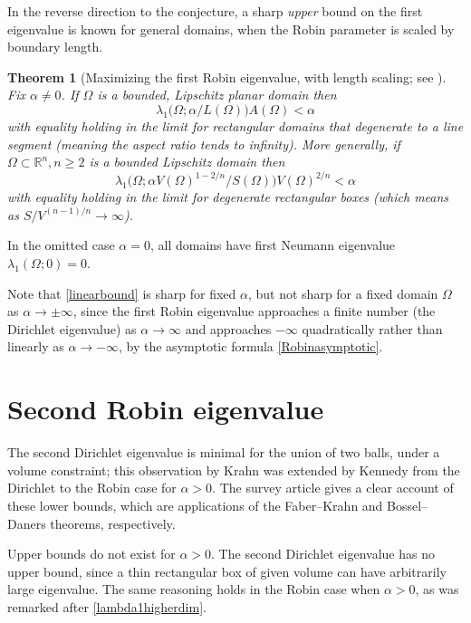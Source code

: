 \documentclass[12pt,reqno]{amsart}
\newtheorem{theorem}{Theorem}[section]
\theoremstyle{definition}
\newcommand{\Rn}{{\mathbb R}^n}
\begin{document}
In the reverse direction to the conjecture, a sharp \emph{upper} bound on the first eigenvalue is known for general domains, when the Robin parameter is scaled by boundary length.
%
\begin{theorem}[Maximizing the first Robin eigenvalue, with length scaling; see ] \label{linearbound}
Fix $\alpha \neq 0$. If $\Omega$ is a bounded, Lipschitz planar domain then 
\[
\lambda_1\big( \Omega;\alpha/L(\Omega) \big) A(\Omega) < \alpha   
\]
with equality holding in the limit for rectangular domains that degenerate to a line segment (meaning the aspect ratio tends to infinity). More generally, if $\Omega \subset \Rn, n \geq 2$ is a bounded Lipschitz domain then 
\[
\lambda_1\big(\Omega;\alpha V(\Omega)^{1-2/n} /S(\Omega)\big) V(\Omega)^{2/n} < \alpha   
\]
with equality holding in the limit for degenerate rectangular boxes (which means as $S/V^{(n-1)/n} \to \infty$). 
\end{theorem}
%
In the omitted case $\alpha=0$, all domains have first Neumann eigenvalue $\lambda_1(\Omega;0) = 0$. 

Note that \autoref{linearbound} is sharp for fixed $\alpha$, but not sharp for a fixed domain $\Omega$ as $\alpha \to \pm \infty$, since the first Robin eigenvalue approaches a finite number (the Dirichlet eigenvalue) as $\alpha \to \infty$ and approaches $-\infty$ quadratically rather than linearly as $\alpha \to -\infty$, by the asymptotic formula \eqref{Robinasymptotic}. 

\section*{Second Robin eigenvalue}

The second Dirichlet eigenvalue is minimal for the union of two balls, under a volume constraint; this observation by Krahn \cite{K26} was extended by Kennedy \cite{K09} from the Dirichlet to the Robin case for $\alpha>0$. The survey article \cite[{\S}4.6.1]{H17} gives a clear account of these lower bounds, which are applications of the Faber--Krahn and Bossel--Daners theorems, respectively. 

Upper bounds do not exist for $\alpha>0$. The second Dirichlet eigenvalue has no upper bound, since a thin rectangular box of given volume can have arbitrarily large eigenvalue. The same reasoning holds in the Robin case when $\alpha>0$, as was remarked after \autoref{lambda1higherdim}. 
\end{document}
